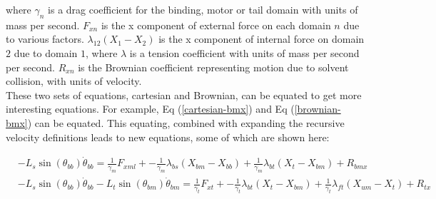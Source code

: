 \documentclass[10pt]{article} %
\begin{document}

where $\gamma_n$ is a drag coefficient for the binding, motor or tail domain with units of mass per second. $F_{xn}$ is the x component of external force on each domain $n$ due to various factors. $\lambda_{12}\left(X_1 - X_2\right)$ is the x component of internal force on domain $2$ due to domain $1$, where $\lambda$ is a tension coefficient with units of mass per second per second. $R_{xn}$ is the Brownian coefficient representing motion due to solvent collision, with units of velocity.\\

These two sets of equations, cartesian and Brownian, can be equated to get more interesting equations. For example, Eq (\ref{cartesian-bmx}) and Eq (\ref{brownian-bmx}) can be equated. This equating, combined with expanding the recursive velocity definitions leads to new equations, some of which are shown here:

\begin{align}
  &-L_s\sin(\theta_{bb})\dot{\theta}_{bb} = \frac{1}{\gamma_m}F_{xml} + -\frac{1}{\gamma_m}\lambda_{bs}(X_{bm} - X_{bb}) + \frac{1}{\gamma_m}\lambda_{bt}(X_{t } - X_{bm}) + R_{bmx} \label{ob_system_first}\\
  &-L_s\sin(\theta_{bb})\dot{\theta}_{bb} - L_t\sin(\theta_{bm})\dot{\theta}_{bm} = \frac{1}{\gamma_t}F_{xt } + -\frac{1}{\gamma_t}\lambda_{bt}(X_{t } - X_{bm}) + \frac{1}{\gamma_t}\lambda_{ft}(X_{um} - X_{t }) + R_{tx}
\end{align}
\end{document}
